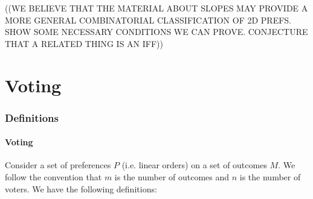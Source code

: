 \documentclass[12pt]{article}
\newcommand{\1}[1]{\mathds{1}[{#1}]}
\begin{document}
    ((WE BELIEVE THAT THE MATERIAL ABOUT SLOPES MAY PROVIDE A MORE GENERAL
    COMBINATORIAL CLASSIFICATION OF 2D PREFS. SHOW SOME NECESSARY CONDITIONS WE
    CAN PROVE. CONJECTURE THAT A RELATED THING IS AN IFF))




\clearpage
\part{Voting}

\section{Definitions}
  \subsection{Voting}
    Consider a set of preferences $P$ (i.e. linear orders) on a
    set of outcomes $M$.
    We follow the convention that $m$ is the number of outcomes and $n$
    is the number of voters.
    We have the following definitions:
\end{document}
